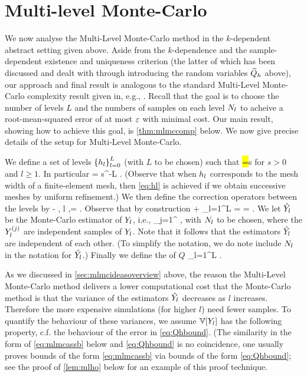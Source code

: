 \section{Multi-level Monte-Carlo}\label{sec:mlmcan}
We now analyse the Multi-Level Monte-Carlo method in the $k$-dependent abstract setting given above. Aside from the $k$-dependence and the sample-dependent existence and uniqueness criterion (the latter of which has been discussed and dealt with through introducing the random variables $\widetilde{Q}_{h}$ above), our approach and final result is analogous to the standard Multi-Level Monte-Carlo complexity result given in, e.g., \cite[Theorem 1]{ClGiScTe:11}. Recall that the goal is to choose the number of levels $L$ and the numbers of samples on each level $N_{l}$ to acheive a root-mean-squared error of at most $\varepsilon$ with minimal cost. Our main result, showing how to achieve this goal, is \cref{thm:mlmccomp} below. We now give precise details of the setup for Multi-Level Monte-Carlo.

We define a set of levels $\set{\hl}_{l=0}^L$ (with $L$ to be chosen) such that
\beq\label{eq:hl}
\hl =\frac{\hlmo}s
\eeq
for $s > 0$ and $l \geq 1$. In particular
\beq\label{eq:hL}
\hL = s^{-L} \hz.
\eeq
(Observe that when $h_{l}$ corresponds to the mesh width of a finite-element mesh, then \cref{eq:hl} is achieved if we obtain successive meshes by uniform refinement.) We then define the correction operators between the levels by
\beqs
\Yl \de \Qhltilde - \Qhlmotilde, l ,\quad \Yz = \Qhztilde.
\eeqs
Observe that by construction
\beq\label{eq:expectationtelescope}
\EXP{\Yz} + \sum_{l=1}^L \EXP{\Yl} =  = \EXP{\QhLtilde}.
\eeq
We let $\hat{Y_{l}}$ be the Monte-Carlo estimator of $Y_{l}$, i.e.,
 \beqs
\Ylhat \de {}\sum_{j=1}^{\Nl} \Ylj,
 \eeqs
 with $N_{l}$ to be chosen, where the $Y_{l}^{(j)}$ are independent samples of $Y_{l}$. Note that it follows that the estimators $\hat{Y_{l}}$ are independent of each other. (To simplify the notation, we do note include $N_{l}$ in the notation for $\hat{Y_{l}}$.) Finally we define the  of $Q$
 \beqs
 \QhatMLhL \de \sum_{l=1}^L \Ylhat.
 \eeqs

 As we discussed in \cref{sec:mlmcideasoverview} above, the reason the Multi-Level Monte-Carlo method delivers a lower computational cost that the Monte-Carlo method is that the variance of the estimators $\hat{Y_{l}}$ decreases as $l$ increases. Therefore the more expensive simulations (for higher $l$) need fewer samples. To quantify the behaviour of these variances, we assume $\VAR{\Yl}$ has the following property, c.f. the behaviour of the error in \cref{eq:Qhbound}. (The similarity in the form of \cref{eq:mlmcassb} below and \cref{eq:Qhbound} is no coincidence, one usually proves bounds of the form \cref{eq:mlmcassb} via bounds of the form \cref{eq:Qhbound}; see the proof of \cref{lem:mlho} below for an example of this proof technique.

